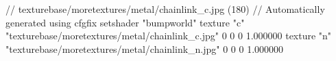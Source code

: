 // texturebase/moretextures/metal/chainlink_c.jpg (180)
// Automatically generated using cfgfix
setshader "bumpworld"
texture "c" "texturebase/moretextures/metal/chainlink_c.jpg" 0 0 0 1.000000
texture "n" "texturebase/moretextures/metal/chainlink_n.jpg" 0 0 0 1.000000
